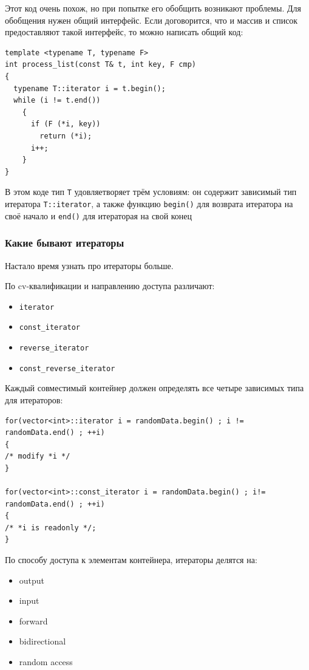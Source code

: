 \documentclass[a4paper,12pt,oneside]{article}
\begin{document}
Этот код очень похож, но при попытке его обобщить возникают проблемы. Для обобщения нужен общий интерфейс. Если договорится, что и массив и список предоставляют такой интерфейс, то можно написать общий код:

\begin{lstlisting}
template <typename T, typename F>
int process_list(const T& t, int key, F cmp)
{
  typename T::iterator i = t.begin();
  while (i != t.end())
    {
      if (F (*i, key)) 
        return (*i);
      i++;
    }  
}
\end{lstlisting}

В этом коде тип \lstinline!T! удовляетворяет трём условиям: он содержит зависимый тип итератора \lstinline!T::iterator!, а также функцию \lstinline!begin()! для возврата итератора на своё начало и \lstinline!end()! для итераторая на свой конец

\subsubsection{Какие бывают итераторы}

Настало время узнать про итераторы больше. 

По cv-квалификации и направлению доступа различают:

\begin{itemize}
\item \lstinline!iterator!
\item \lstinline!const_iterator!
\item \lstinline!reverse_iterator!
\item \lstinline!const_reverse_iterator!
\end{itemize}

Каждый совместимый контейнер должен определять все четыре зависимых типа для итераторов:

\begin{lstlisting}
for(vector<int>::iterator i = randomData.begin() ; i != randomData.end() ; ++i)
{
/* modify *i */
}

for(vector<int>::const_iterator i = randomData.begin() ; i!= randomData.end() ; ++i) 
{
/* *i is readonly */;
}
\end{lstlisting}

По способу доступа к элементам контейнера, итераторы делятся на:

\begin {itemize}
\item output
\item input
\item forward
\item bidirectional
\item random access
\end {itemize}
\end{document}
